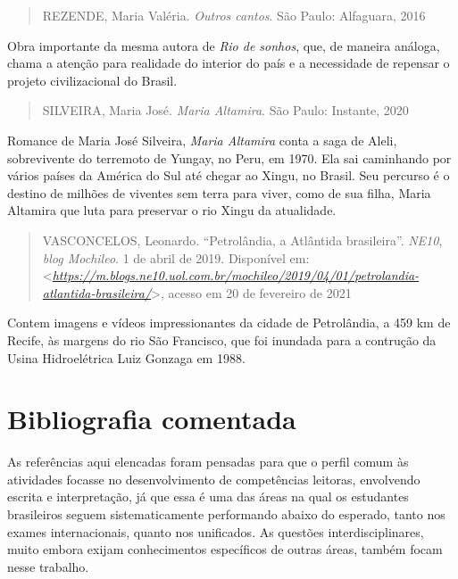 \documentclass{extarticle}
\begin{document}
    \begin{quote}
    REZENDE, Maria Valéria. \emph{Outros cantos}. São Paulo: Alfaguara,
    2016
    \end{quote}

    Obra importante da mesma autora de \emph{Rio de sonhos}, que, de
    maneira análoga, chama a atenção para realidade do interior do país
    e a necessidade de repensar o projeto civilizacional do Brasil.

    \begin{quote}
    SILVEIRA, Maria José. \emph{Maria Altamira}. São Paulo: Instante,
    2020
    \end{quote}

    Romance de Maria José Silveira, \emph{Maria Altamira} conta a saga
    de Aleli, sobrevivente do terremoto de Yungay, no Peru, em 1970. Ela
    sai caminhando por vários países da América do Sul até chegar ao
    Xingu, no Brasil. Seu percurso é o destino de milhões de viventes
    sem terra para viver, como de sua filha, Maria Altamira que luta
    para preservar o rio Xingu da atualidade.

    \begin{quote}
    VASCONCELOS, Leonardo. ``Petrolândia, a Atlântida brasileira''.
    \emph{NE10}, \emph{blog Mochileo}. 1 de abril de 2019. Disponível
    em:
    \textless{}\href{https://m.blogs.ne10.uol.com.br/mochileo/2019/04/01/petrolandia-atlantida-brasileira/}{\emph{https://m.blogs.ne10.uol.com.br/mochileo/2019/04/01/petrolandia-atlantida-brasileira/}}\textgreater{},
    acesso em 20 de fevereiro de 2021
    \end{quote}

    Contem imagens e vídeos impressionantes da cidade de Petrolândia, a
    459 km de Recife, às margens do rio São Francisco, que foi inundada
    para a contrução da Usina Hidroelétrica Luiz Gonzaga em 1988.


\section{Bibliografia comentada}

    As referências aqui elencadas foram pensadas para que o perfil comum
    às atividades focasse no desenvolvimento de competências leitoras,
    envolvendo escrita e interpretação, já que essa é uma das áreas na
    qual os estudantes brasileiros seguem sistematicamente performando
    abaixo do esperado, tanto nos exames internacionais, quanto nos
    unificados. As questões interdisciplinares, muito embora exijam
    conhecimentos específicos de outras áreas, também focam nesse
    trabalho.
\end{document}
